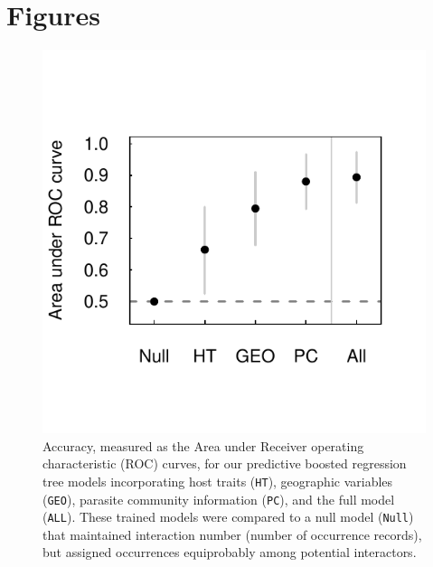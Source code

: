 \documentclass[12pt]{article}
\begin{document}
   
   
   

\newpage
\section{Figures}
\begin{figure}[h!]
  \includegraphics[width=\textwidth]{Figures/brtAccuracy.pdf}
  \caption{Accuracy, measured as the Area under Receiver operating characteristic (ROC) curves, for our predictive boosted regression tree models incorporating host traits (\texttt{HT}), geographic variables (\texttt{GEO}), parasite community information (\texttt{PC}), and the full model (\texttt{ALL}). These trained models were compared to a null model (\texttt{Null}) that maintained interaction number (number of occurrence records), but assigned occurrences equiprobably among potential interactors.}
 \label{fig:brtAccuracy}
 \end{figure}

 
\end{document}
